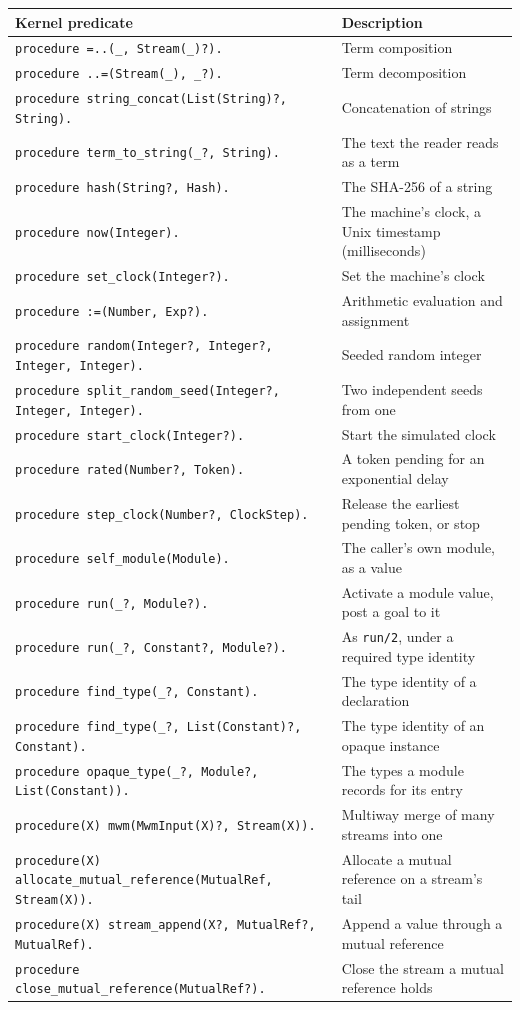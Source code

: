 \begin{center}
{\small
\begin{tabular}{ll}
\textbf{Kernel predicate} & \textbf{Description} \\
\hline
\verb|procedure =..(_, Stream(_)?).| & Term composition \\
\verb|procedure ..=(Stream(_), _?).| & Term decomposition \\
\verb|procedure string_concat(List(String)?, String).| & Concatenation of strings \\
\verb|procedure term_to_string(_?, String).| & The text the reader reads as a term \\
\verb|procedure hash(String?, Hash).| & The SHA-256 of a string \\
\verb|procedure now(Integer).| & The machine's clock, a Unix timestamp (milliseconds) \\
\verb|procedure set_clock(Integer?).| & Set the machine's clock \\
\verb|procedure :=(Number, Exp?).| & Arithmetic evaluation and assignment \\
\verb|procedure random(Integer?, Integer?, Integer, Integer).| & Seeded random integer \\
\verb|procedure split_random_seed(Integer?, Integer, Integer).| & Two independent seeds from one \\
\verb|procedure start_clock(Integer?).| & Start the simulated clock \\
\verb|procedure rated(Number?, Token).| & A token pending for an exponential delay \\
\verb|procedure step_clock(Number?, ClockStep).| & Release the earliest pending token, or stop \\
\verb|procedure self_module(Module).| & The caller's own module, as a value \\
\verb|procedure run(_?, Module?).| & Activate a module value, post a goal to it \\
\verb|procedure run(_?, Constant?, Module?).| & As \verb|run/2|, under a required type identity \\
\verb|procedure find_type(_?, Constant).| & The type identity of a declaration \\
\verb|procedure find_type(_?, List(Constant)?, Constant).| & The type identity of an opaque instance \\
\verb|procedure opaque_type(_?, Module?, List(Constant)).| & The types a module records for its entry \\
\verb|procedure(X) mwm(MwmInput(X)?, Stream(X)).| & Multiway merge of many streams into one \\
\verb|procedure(X) allocate_mutual_reference(MutualRef, Stream(X)).| & Allocate a mutual reference on a stream's tail \\
\verb|procedure(X) stream_append(X?, MutualRef?, MutualRef).| & Append a value through a mutual reference \\
\verb|procedure close_mutual_reference(MutualRef?).| & Close the stream a mutual reference holds \\
\end{tabular}
}
\end{center}

